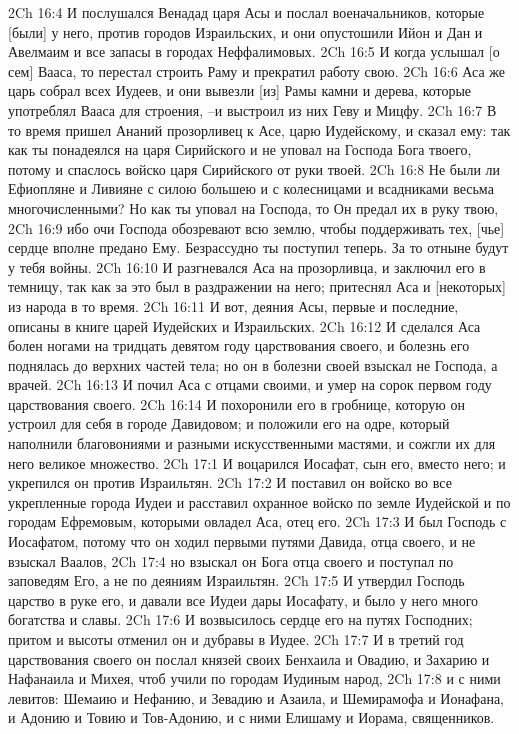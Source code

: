 2Ch 16:4  И послушался Венадад царя Асы и послал военачальников, которые [были] у него, против городов Израильских, и они опустошили Ийон и Дан и Авелмаим и все запасы в городах Неффалимовых.
2Ch 16:5  И когда услышал [о сем] Вааса, то перестал строить Раму и прекратил работу свою.
2Ch 16:6  Аса же царь собрал всех Иудеев, и они вывезли [из] Рамы камни и дерева, которые употреблял Вааса для строения, --и выстроил из них Геву и Мицфу.
2Ch 16:7  В то время пришел Ананий прозорливец к Асе, царю Иудейскому, и сказал ему: так как ты понадеялся на царя Сирийского и не уповал на Господа Бога твоего, потому и спаслось войско царя Сирийского от руки твоей.
2Ch 16:8  Не были ли Ефиопляне и Ливияне с силою большею и с колесницами и всадниками весьма многочисленными? Но как ты уповал на Господа, то Он предал их в руку твою,
2Ch 16:9  ибо очи Господа обозревают всю землю, чтобы поддерживать тех, [чье] сердце вполне предано Ему. Безрассудно ты поступил теперь. За то отныне будут у тебя войны.
2Ch 16:10  И разгневался Аса на прозорливца, и заключил его в темницу, так как за это был в раздражении на него; притеснял Аса и [некоторых] из народа в то время.
2Ch 16:11  И вот, деяния Асы, первые и последние, описаны в книге царей Иудейских и Израильских.
2Ch 16:12  И сделался Аса болен ногами на тридцать девятом году царствования своего, и болезнь его поднялась до верхних частей тела; но он в болезни своей взыскал не Господа, а врачей.
2Ch 16:13  И почил Аса с отцами своими, и умер на сорок первом году царствования своего.
2Ch 16:14  И похоронили его в гробнице, которую он устроил для себя в городе Давидовом; и положили его на одре, который наполнили благовониями и разными искусственными мастями, и сожгли их для него великое множество.
2Ch 17:1  И воцарился Иосафат, сын его, вместо него; и укрепился он против Израильтян.
2Ch 17:2  И поставил он войско во все укрепленные города Иудеи и расставил охранное войско по земле Иудейской и по городам Ефремовым, которыми овладел Аса, отец его.
2Ch 17:3  И был Господь с Иосафатом, потому что он ходил первыми путями Давида, отца своего, и не взыскал Ваалов,
2Ch 17:4  но взыскал он Бога отца своего и поступал по заповедям Его, а не по деяниям Израильтян.
2Ch 17:5  И утвердил Господь царство в руке его, и давали все Иудеи дары Иосафату, и было у него много богатства и славы.
2Ch 17:6  И возвысилось сердце его на путях Господних; притом и высоты отменил он и дубравы в Иудее.
2Ch 17:7  И в третий год царствования своего он послал князей своих Бенхаила и Овадию, и Захарию и Нафанаила и Михея, чтоб учили по городам Иудиным народ,
2Ch 17:8  и с ними левитов: Шемаию и Нефанию, и Зевадию и Азаила, и Шемирамофа и Ионафана, и Адонию и Товию и Тов-Адонию, и с ними Елишаму и Иорама, священников.
